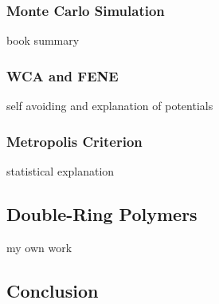 \documentclass{article}      %
\begin{document}
\subsubsection{Monte Carlo Simulation}
book summary

\subsubsection{WCA and FENE}
self avoiding and explanation of potentials

\subsubsection{Metropolis Criterion}
statistical explanation

\subsection{Double-Ring Polymers}
my own work

\subsection{Conclusion}



\pagebreak



\end{document}
